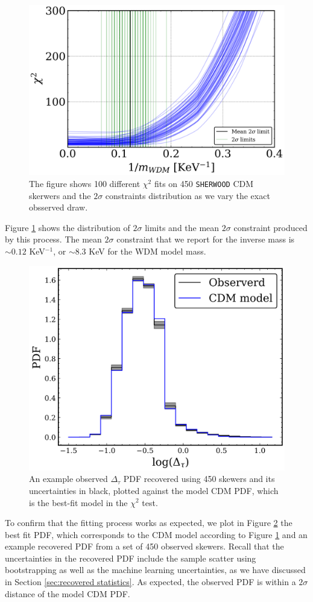 \begin{figure}
    \centering
    \includegraphics[width=0.8\linewidth]{img/ML/inference_cdm_sherwood.png}
    \caption{The figure shows 100 different $\chi^2$ fits on 450 \texttt{SHERWOOD} CDM skerwers and the $2\sigma$ constraints distribution as we vary the exact obsserved draw.}
    \label{fig: inference cdm sherwood}
\end{figure}
Figure \ref{fig: inference cdm sherwood} shows the distribution of $2\sigma$ limits and the mean $2\sigma$ constraint produced by this process. The mean $2\sigma$ constraint that we report for the inverse mass is $\sim 0.12$ KeV$^{-1}$, or $\sim 8.3$ KeV for the WDM model mass.

\begin{figure}
    \centering
    \includegraphics[width=0.6\linewidth]{img/ML/pdf_model_observed.png}
    \caption{An example observed $\Delta_\tau$ PDF recovered using 450 skewers and its uncertainties in black, plotted against the model CDM PDF, which is the best-fit model in the $\chi^2$ test. }
    \label{fig: inference cdm PDF}
\end{figure}

To confirm that the fitting process works as expected, we plot in Figure \ref{fig: inference cdm PDF} the best fit PDF, which corresponds to the CDM model according to Figure \ref{fig: inference cdm sherwood} and an example recovered PDF from a set of 450 observed skewers. Recall that the uncertainties in the recovered PDF include the sample scatter using bootstrapping as well as the machine learning uncertainties, as we have discussed in Section \ref{sec:recovered statistics}. As expected, the observed PDF is within a $2\sigma$ distance of the model CDM PDF.

